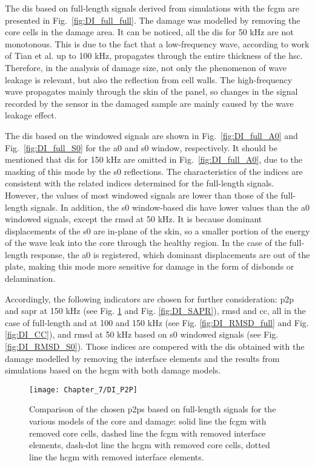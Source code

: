 The \acp{di} based on full-length signals derived from simulations with the \ac{fcgm} are presented in Fig.~\ref{fig:DI_full_full}.
The damage was modelled by removing the core cells in the damage area.
It can be noticed, all the \acp{di} for 50 \unit{\kHz} are not monotonous.
This is due to the fact that a low-frequency wave, according to work of Tian et al. \cite{tian2015wavenumber} up to 100 \unit{\kHz}, propagates through the entire thickness of the \ac{hsc}.
Therefore, in the analysis of damage size, not only the phenomenon of wave leakage is relevant, but also the reflection from cell walls.  
The high-frequency wave propagates mainly through the skin of the panel, so changes in the signal recorded by the sensor in the damaged sample are mainly caused by the wave leakage effect.

The \acp{di} based on the windowed signals are shown in Fig.~\ref{fig:DI_full_A0} and Fig.~\ref{fig:DI_full_S0} for the \ac{a0} and \ac{s0} window, respectively.
It should be mentioned that \acp{di} for 150 \unit{\kHz} are omitted in Fig.~\ref{fig:DI_full_A0}, due to the masking of this mode by the \ac{s0} reflections.
The characteristics of the indices are consistent with the related indices determined for the full-length signals.
However, the values of most windowed signals are lower than those of the full-length signals.
In addition, the \ac{s0} window-based \acp{di} have lower values than the \ac{a0} windowed signals, except the \ac{rmsd} at 50 \unit{kHz}.
It is because dominant displacements of the \ac{s0} are in-plane of the skin, so a smaller portion of the energy of the wave leak into the core through the healthy region.
In the case of the full-length response, the \ac{a0} is registered, which dominant displacements are out of the plate, making this mode more sensitive for damage in the form of disbonds or delamination.

Accordingly, the following indicators are chosen for further consideration: \ac{p2p} and \ac{sapr} at 150 \unit{kHz} (see Fig. \ref{fig:DI_P2P} and Fig. \ref{fig:DI_SAPR}), \ac{rmsd} and \ac{cc}, all in the case of full-length and at 100 and 150 \unit{\kHz} (see Fig. \ref{fig:DI_RMSD_full} and Fig. \ref{fig:DI_CC}), and \ac{rmsd} at 50 \unit{kHz} based on \ac{s0} windowed signals (see Fig. \ref{fig:DI_RMSD_S0}).
Those indices are compered with the \acp{di} obtained with the damage modelled by removing the interface elements and the results from simulations based on the \ac{hcgm} with both damage models.

\begin{figure}[!tbh]
	\begin{center}
		\texttt{[image: Chapter\_7/DI\_P2P]}
	\end{center}
	\caption{Comparison of the chosen \acfp{p2p} based on full-length signals for the various models of the core and damage: solid line the \acf{fcgm} with removed core cells, dashed line the \acf{fcgm} with removed interface elements, dash-dot line the \acf{hcgm} with removed core cells, dotted line the \acf{hcgm} with removed interface elements.}
	\label{fig:DI_P2P}
\end{figure}

